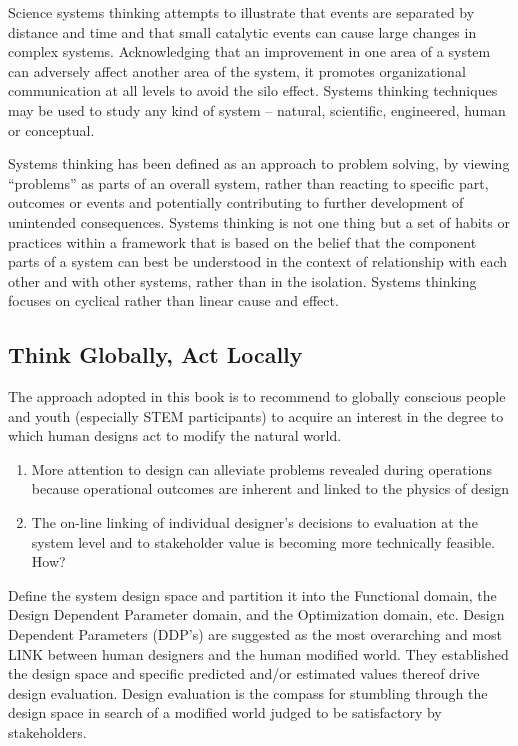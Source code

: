 Science systems thinking attempts to illustrate that events are separated by distance and time and that small catalytic events can cause large changes in complex systems. Acknowledging that an improvement in one area of a system can adversely affect another area of the system, it promotes organizational communication at all levels to avoid the silo effect. Systems thinking techniques may be used to study any kind of system – natural, scientific, engineered, human or conceptual.

Systems thinking has been defined as an approach to problem solving, by viewing “problems” as parts of an overall system, rather than reacting to specific part, outcomes or events and potentially contributing to further development of unintended consequences. Systems thinking is not one thing but a set of habits or practices within a framework that is based on the belief that the component parts of a system can best be understood in the context of relationship with each other and with other systems, rather than in the isolation. Systems thinking focuses on cyclical rather than linear cause and effect.

\subsection{Think Globally, Act Locally}

The approach adopted in this book is to recommend to globally conscious people and youth (especially STEM participants) to acquire an interest in the degree to which human designs act to modify the natural world.
\begin{enumerate}
\item More attention to design can alleviate problems revealed during operations because operational outcomes are inherent and linked to the physics of design
\item The on-line linking of individual designer’s decisions to evaluation at the system level and to stakeholder value is becoming more technically feasible. How?
\end{enumerate}

Define the system design space and partition it into the Functional domain, the Design Dependent Parameter domain, and the Optimization domain, etc.
Design Dependent Parameters (DDP’s) are suggested as the most overarching and most LINK between human designers and the human modified world. They established the design space and specific predicted and/or estimated values thereof drive design evaluation.
Design evaluation is the compass for stumbling through the design space in search of a modified world judged to be satisfactory by stakeholders.

